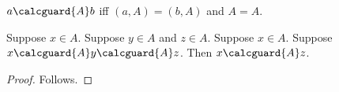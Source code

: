 \begin{abbreviation}\label{calculation_guarded_equality}
    $a\calcguard{A}b$ iff $(a,A)=(b,A)$ and $A=A$.
\end{abbreviation}

\begin{composition}\label{calculation_several_conditions}
    Suppose $x\in A$.
    Suppose $y\in A$ and $z\in A$.
    Suppose $x\in A$.
    Suppose $x\calcguard{A}y\calcguard{A}z$.
    Then $x\calcguard{A}z$.
\end{composition}
\begin{proof}
    Follows.
\end{proof}

